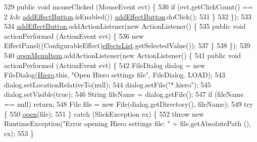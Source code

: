 \begin{DoxyCode}
529             \textcolor{keyword}{public} \textcolor{keywordtype}{void} mouseClicked (MouseEvent evt) \{
530                 \textcolor{keywordflow}{if} (evt.getClickCount() == 2 && \mbox{\hyperlink{classorg_1_1newdawn_1_1slick_1_1tools_1_1hiero_1_1_hiero_a7dd9542f73944fa537d025f2c87f1b20}{addEffectButton}}.isEnabled()) 
      \mbox{\hyperlink{classorg_1_1newdawn_1_1slick_1_1tools_1_1hiero_1_1_hiero_a7dd9542f73944fa537d025f2c87f1b20}{addEffectButton}}.doClick();
531             \}
532         \});
533 
534         \mbox{\hyperlink{classorg_1_1newdawn_1_1slick_1_1tools_1_1hiero_1_1_hiero_a7dd9542f73944fa537d025f2c87f1b20}{addEffectButton}}.addActionListener(\textcolor{keyword}{new} ActionListener() \{
535             \textcolor{keyword}{public} \textcolor{keywordtype}{void} actionPerformed (ActionEvent evt) \{
536                 \textcolor{keyword}{new} EffectPanel((ConfigurableEffect)\mbox{\hyperlink{classorg_1_1newdawn_1_1slick_1_1tools_1_1hiero_1_1_hiero_aff0431ced360227e02cdf9bcd21fd4d2}{effectsList}}.getSelectedValue());
537             \}
538         \});
539 
540         \mbox{\hyperlink{classorg_1_1newdawn_1_1slick_1_1tools_1_1hiero_1_1_hiero_afd5b856520d9a369e33589a7ba546e4b}{openMenuItem}}.addActionListener(\textcolor{keyword}{new} ActionListener() \{
541             \textcolor{keyword}{public} \textcolor{keywordtype}{void} actionPerformed (ActionEvent evt) \{
542                 FileDialog dialog = \textcolor{keyword}{new} FileDialog(\mbox{\hyperlink{classorg_1_1newdawn_1_1slick_1_1tools_1_1hiero_1_1_hiero_ad35908dac0e9755fd418874dff6d2dcd}{Hiero}}.this, \textcolor{stringliteral}{"Open Hiero settings file"}, FileDialog.
      LOAD);
543                 dialog.setLocationRelativeTo(null);
544                 dialog.setFile(\textcolor{stringliteral}{"*.hiero"});
545                 dialog.setVisible(\textcolor{keyword}{true});
546                 String fileName = dialog.getFile();
547                 \textcolor{keywordflow}{if} (fileName == null) \textcolor{keywordflow}{return};
548                 File file = \textcolor{keyword}{new} File(dialog.getDirectory(), fileName);
549                 \textcolor{keywordflow}{try} \{
550                     \mbox{\hyperlink{classorg_1_1newdawn_1_1slick_1_1tools_1_1hiero_1_1_hiero_a12c8a8bdd2025e9f45f487f773789ff8}{open}}(file);
551                 \} \textcolor{keywordflow}{catch} (SlickException ex) \{
552                     \textcolor{keywordflow}{throw} \textcolor{keyword}{new} RuntimeException(\textcolor{stringliteral}{"Error opening Hiero settings file: "} + file.getAbsolutePath
      (), ex);
553                 \}

\end{DoxyCode}
